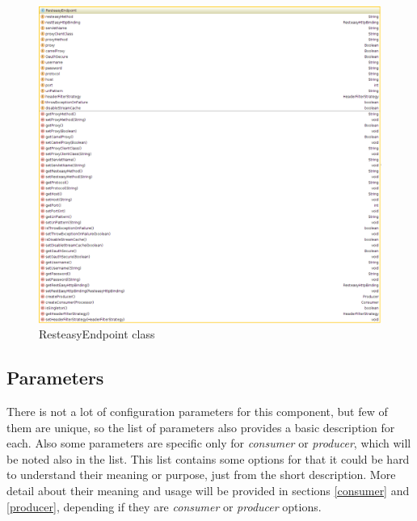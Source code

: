 \documentclass[12pt,final,oneside]{fithesis2}
\begin{document}
\begin{figure}
\centering
\includegraphics[width=0.9\linewidth]{images/endpoint.png}
\caption{ResteasyEndpoint class}
\label{endpoint}
\end{figure}

\subsection{Parameters}
There is not a lot of configuration parameters for this component, but few of them are unique, so the list of parameters also provides a basic description for each. Also some parameters are specific only for \textit{consumer} or \textit{producer}, which will be noted also in the list. This list contains some options for that it could be hard to understand their meaning or purpose, just from the short description. More detail about their meaning and usage will be provided in sections \ref{consumer} and \ref{producer}, depending if they are \textit{consumer} or \textit{producer} options.  
\end{document}
